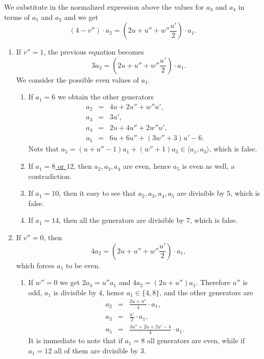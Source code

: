 \documentclass[12pt]{amsart}
\begin{document}
We substitute in the normalized expression above  the values for $a_3$ and $a_4$ in terms of $a_1$ and $a_2$ and we get
$$
(4-v'') \cdot a_2= \left(2u+u''+ w''\frac{u'}{2}\right) \cdot a_1.
$$
	\begin{enumerate}[leftmargin=0.5cm,label*=\arabic*.]
		\item If \underline{$v''=1$}, the previous equation becomes
		$$
		3a_2= \left(2u+u''+w''\frac{u'}{2}\right) \cdot a_1. 
		$$
		We consider the possible even values of $a_1$. 
		\begin{enumerate}[leftmargin=0.5cm, label*=\arabic*.]
		 \item If \underline{$a_1=6$} we obtain the other generators
			\begin{eqnarray*}
				a_2 &=& 4u+2u''+w''u',\\
				a_3 &=& 3u', \\
				a_4 &=&2u+4u''+2w''u', \\
				a_5 &=& 6u+6u''+ (3w''+3)u'-6.
			\end{eqnarray*}
			Note that $a_5 = (u+u''-1) a_1+ (w''+1) a_3\in \langle a_1, a_3 \rangle$, which is false.
		 \item If \underline{$a_1=8$ or $12$}, then $a_2,a_3, a_4$ are even, hence $a_5$ is even as well, a contradiction.
		 \item If \underline{$a_1=10$}, then it easy to see that $a_2,a_3, a_4, a_5$ are divisible by $5$, which is false.
		 \item If \underline{$a_1=14$}, then all the generators are divisible by $7$, which is false.
		\end{enumerate}
		\item If \underline{$v''=0$}, then
			$$
				4a_2= \left(2u+u''+w''\frac{u'}{2}\right)\cdot a_1,
			$$
			which forces $a_1$ to be even.
			\begin{enumerate}[leftmargin=0.5cm, label*=\arabic*.]
				\item If \underline{$w''=0$} we get $2 a_4= u'' a_1$ and $4 a_2= (2u+u'') a_1$. Therefore $u''$ is odd, $a_1$ is divisible by $4$, hence $a_1\in \{4,8\}$,
				and the other generators are
					\begin{eqnarray*}
						a_2 &=& \frac{2u+u''}{4}\cdot a_1,\\
						a_3 &=& \frac{u'}{2}\cdot a_1, \\
						a_5 &=& \frac{3u''+2u+2u'-4}{4}\cdot a_1.
					\end{eqnarray*}
					It is immediate to note that if $a_1=8$ all generators are even, while if $a_1=12$ all of them are divisible by $3$. 

\end{enumerate}
\end{enumerate}
\end{document}
